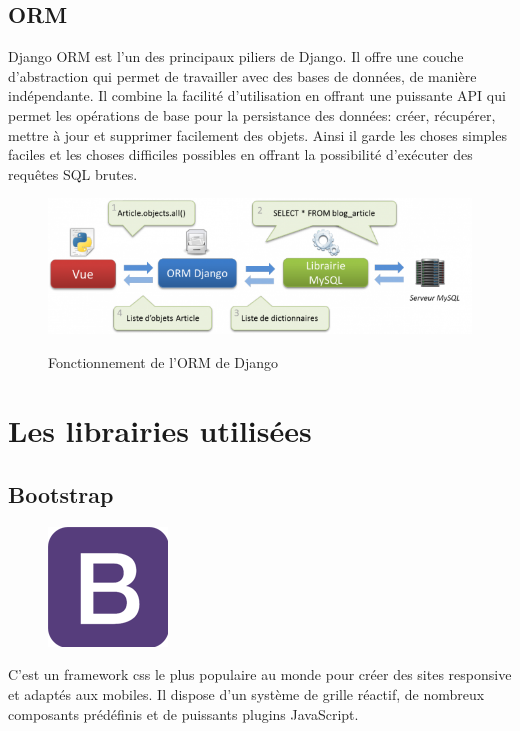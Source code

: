     \subsection{ORM}
        Django ORM est l'un des principaux piliers de Django. Il offre une couche d'abstraction qui permet de travailler avec des bases de données, de manière indépendante. Il combine la facilité d'utilisation en offrant une puissante API qui permet les opérations de base pour la persistance des données: créer, récupérer, mettre à jour et supprimer facilement des objets. Ainsi il garde les choses simples faciles et les choses difficiles possibles en offrant la possibilité d’exécuter des requêtes SQL brutes\cite{48}.
        
        
        \begin{figure}[h!]
                     \centering
                        \includegraphics[scale=0.8 ]{images/ORM.png}
                        \label{fig77}
                     \caption{Fonctionnement de l'ORM de Django}
                     \label{}
        \end{figure}
\clearpage       

\section{Les librairies utilisées}
    \subsection{Bootstrap}
            \begin{figure}
                \vspace{-22pt}
              \begin{center}
                 \includegraphics[scale=0.36]{images/logo/bootstrap.png}
                 \label{fig78}
              \end{center}
              \vspace{-20pt}
              \vspace{-10pt}
            \end{figure}
        C’est un framework css le plus populaire au monde pour créer des sites responsive et adaptés aux mobiles. Il dispose d’un système de grille réactif, de nombreux composants prédéfinis et de puissants plugins JavaScript\cite{22}.
        
